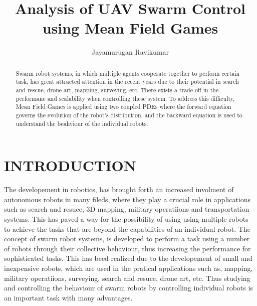 \documentclass[a4paper, 10pt, conference]{ieeeconf}      %
\title{\LARGE \bf
Analysis of UAV Swarm Control using Mean Field Games
}
\author{Jayamurugan Ravikumar}
\begin{document}
\maketitle
\thispagestyle{empty}
\pagestyle{empty}


\begin{abstract}
	Swarm robot systems, in which multiple agents cooperate together to perform certain task, has  great attracted attention in the recent years due to their potential in search and rescue, drone art, mapping, surveying, etc. There exists a trade off in the performane and scalability when controlling these system. To address this difficulty, Mean Field Games is applied using two coupled PDEs where the forward equation governs the evolution of the robot's distribution, and the backward equation is used to understand the beahviour of the individual robots. 



\end{abstract}


\section{INTRODUCTION}

The developement in robotics, has brought forth an increased involment of autonomous robots in many fileds, where they play a crucial role in applications such as search and resuce, 3D mapping, military operatiions and transportation systems\cite{b3}. This has paved a way for the possibility of using using multiple robots to achieve the tasks that are beyond the capabilities of an individual robot. The concept of swarm robot systems, is developed to perform a task using a number of robots through their collective behaviour, thus increasing the performance for sophisticated tasks\cite{b4}. This has beed realized due to the developement of small and inexpensive robots, which are used in the pratical applications such as, mapping, military operatiions, surveying, search and resuce, drone art, etc\cite{b6}. Thus studying and controlling the behaviour of swarm robots by controlling individual robots is an important task with many advantages.
\end{document}
